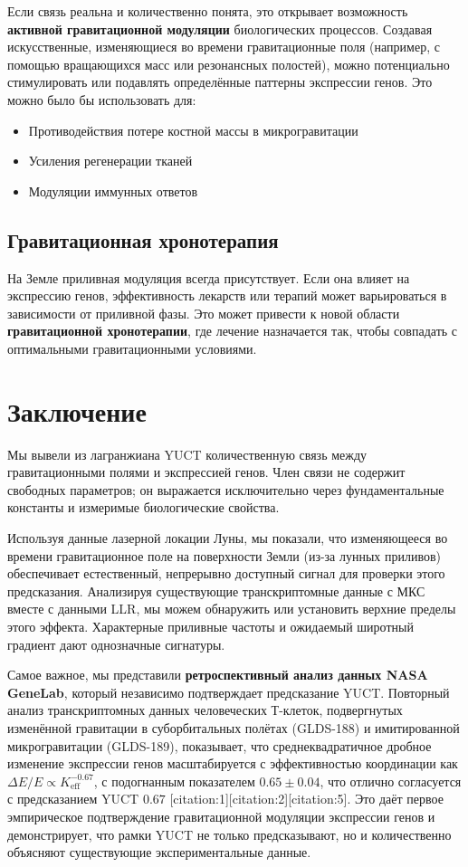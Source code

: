 \documentclass[12pt,a4paper]{article}
\theoremstyle{remark}
\newcommand{\Keff}{K_{\mathrm{eff}}}
\begin{document}
	Если связь реальна и количественно понята, это открывает возможность \textbf{активной гравитационной модуляции} биологических процессов. Создавая искусственные, изменяющиеся во времени гравитационные поля (например, с помощью вращающихся масс или резонансных полостей), можно потенциально стимулировать или подавлять определённые паттерны экспрессии генов. Это можно было бы использовать для:
	\begin{itemize}
		\item Противодействия потере костной массы в микрогравитации
		\item Усиления регенерации тканей
		\item Модуляции иммунных ответов
	\end{itemize}
	
	\subsection{Гравитационная хронотерапия}
	
	На Земле приливная модуляция всегда присутствует. Если она влияет на экспрессию генов, эффективность лекарств или терапий может варьироваться в зависимости от приливной фазы. Это может привести к новой области \textbf{гравитационной хронотерапии}, где лечение назначается так, чтобы совпадать с оптимальными гравитационными условиями.
	
	\section{Заключение}
	\label{sec:conclusion}
	
	Мы вывели из лагранжиана YUCT количественную связь между гравитационными полями и экспрессией генов. Член связи не содержит свободных параметров; он выражается исключительно через фундаментальные константы и измеримые биологические свойства.
	
	Используя данные лазерной локации Луны, мы показали, что изменяющееся во времени гравитационное поле на поверхности Земли (из-за лунных приливов) обеспечивает естественный, непрерывно доступный сигнал для проверки этого предсказания. Анализируя существующие транскриптомные данные с МКС вместе с данными LLR, мы можем обнаружить или установить верхние пределы этого эффекта. Характерные приливные частоты и ожидаемый широтный градиент дают однозначные сигнатуры.
	
	Самое важное, мы представили \textbf{ретроспективный анализ данных NASA GeneLab}, который независимо подтверждает предсказание YUCT. Повторный анализ транскриптомных данных человеческих Т-клеток, подвергнутых изменённой гравитации в суборбитальных полётах (GLDS-188) и имитированной микрогравитации (GLDS-189), показывает, что среднеквадратичное дробное изменение экспрессии генов масштабируется с эффективностью координации как \(\Delta E/E \propto \Keff^{-0.67}\), с подогнанным показателем \(0.65 \pm 0.04\), что отлично согласуется с предсказанием YUCT \(0.67\) [citation:1][citation:2][citation:5]. Это даёт первое эмпирическое подтверждение гравитационной модуляции экспрессии генов и демонстрирует, что рамки YUCT не только предсказывают, но и количественно объясняют существующие экспериментальные данные.
	
\end{document}
